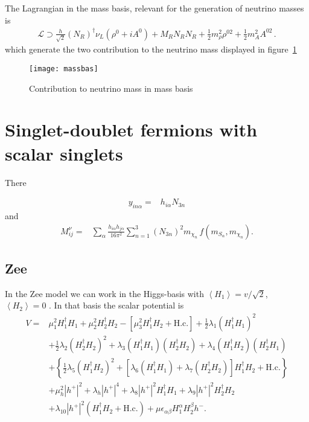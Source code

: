 The Lagrangian in the mass basis, relevant for the generation of neutrino masses is
\begin{align}
  \mathcal{L}\supset \frac{h}{\sqrt{2}} \left( N_R \right)^{\dagger} \nu_L \left( \rho^0+i A^0  \right)
  + M_R N_R N_R + \frac{1}{2}m_{\rho}^2 \rho^{02}+ \frac{1}{2}m_{A}^2 A^{02}\,.
\end{align}
which generate the two contribution to the neutrino mass displayed in figure~\ref{fig:massbas}

\begin{figure}
  \centering
  \texttt{[image: massbas]}
  \caption{Contribution to neutrino mass in mass basis}
  \label{fig:massbas}
\end{figure}
\section{Singlet-doublet fermions with scalar singlets}
There~\cite{Restrepo:2015ura}

\begin{align}
  y_{i n\alpha}=&h_{i\alpha}N_{3n} 
\end{align}
and 
\begin{align}
   M^{\nu}_{ij}=&\sum_{\alpha}\frac{h_{i\alpha}h_{j\alpha}}{16\pi^2}\sum_{n=1}^3 \left( N_{3n} \right)^2m_{\chi_n}
\,f\left( m_{S_\alpha},m_{\chi_n} \right).
\end{align}

\subsection{Zee}

In the Zee model we can work in the Higgs-basis with $\left\langle H_1 \right\rangle=v/\sqrt{2}$,  $\left\langle H_2 \right\rangle=0$ \cite{AristizabalSierra:2006ri}. In that basis the scalar potential is
\begin{align}
  \label{eq:scalarpotentialinhiggsbas}
  V  = & \mu^{2}_{1}H_{1}^{\dagger}H_{1}
  + \mu^{2}_{2}H_{2}^{\dagger}H_{2}
  - [\mu^{2}_{3}H_{1}^{\dagger}H_{2} + \mbox{H.c.}]
  + \frac{1}{2}\lambda_{1}(H_{1}^{\dagger}H_{1})^{2}
  \nonumber\\
  & + \frac{1}{2}\lambda_{2}(H_{2}^{\dagger}H_{2})^{2}
  + \lambda_{3}(H_{1}^{\dagger}
  H_{1})(H_{2}^{\dagger}H_{2})
  + \lambda_{4}(H_{1}^{\dagger}
  H_{2})(H_{2}^{\dagger}H_{1})
  \nonumber\\
  & + \left\{
    \frac{1}{2}\lambda_{5}(H_{1}^{\dagger}H_{2})^{2}
    + [\lambda_{6}(H_{1}^{\dagger}H_{1})
    + \lambda_{7}(H_{2}^{\dagger}H_{2})]
    H_{1}^{\dagger}H_{2}
    +\mbox{H.c.}
  \right\}
  \nonumber\\
  & + \mu_{h}^{2}|h^{+}|^{2} + \lambda_{h}|h^{+}|^{4}
  + \lambda_{8}|h^{+}|^{2}H_{1}^{\dagger}H_{1} 
  + \lambda_{9}|h^{+}|^{2}H_{2}^{\dagger}H_{2}
  \nonumber\\
  & + \lambda_{10}|h^{+}|^{2}(H_{1}^\dagger H_{2}
  + \mbox{H.c.})
  + \mu\epsilon_{\alpha\beta}H_{1}^{\alpha}
  H_{2}^{\beta}h^{-}.
\end{align}

